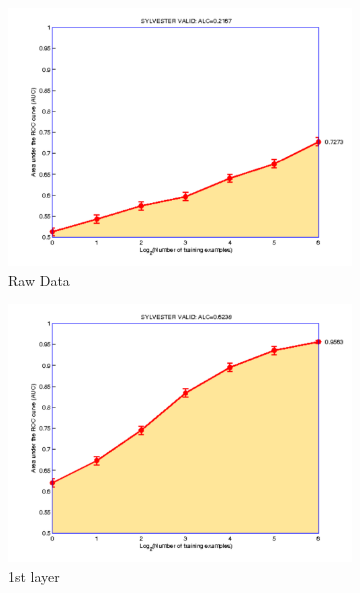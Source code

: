 \begin{figure}
\centering
\begin{subfigure}{.3\textwidth}
\centering
\includegraphics[height=0.15\textheight,keepaspectratio]{article1/images/syl4.pdf}
\caption{Raw Data}
\end{subfigure}
\begin{subfigure}{.3\textwidth}
\centering
\includegraphics[height=0.15\textheight,keepaspectratio]{article1/images/syl0.pdf}
\caption{1st layer}
\end{subfigure}
\begin{subfigure}{.3\textwidth}
\centering

\end{subfigure}
\end{figure}
